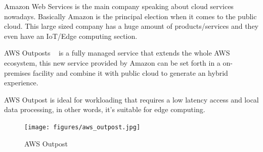 Amazon Web Services is the main company speaking about cloud services nowadays. Basically Amazon is the principal election when it comes to the public cloud.
This large sized company has a huge amount of products/services and they even have an IoT/Edge computing section.

AWS Outposts ~\cite{aws_outpost} is a fully managed service that extends the whole AWS ecosystem, this new service provided by Amazon can be set forth in a on-premises facility and combine it with public cloud to generate an hybrid experience.

AWS Outpost is ideal for workloading that requires a low latency access and local data processing, in other words, it's suitable for edge computing.

\begin{figure}[h]%
    \texttt{[image: figures/aws\_outpost.jpg]}
~\caption{AWS Outpost}
\label{figure2.3}
\end{figure}